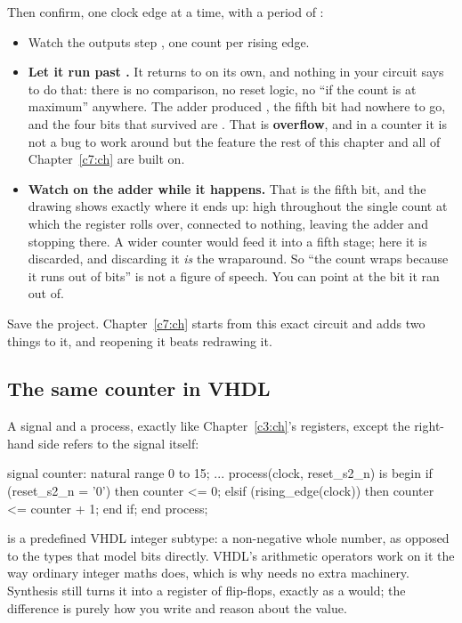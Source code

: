 \noindent Then confirm, one clock edge at a time, with a period of :
\begin{itemize}
  \item Watch the outputs step , one count per rising edge.
  \item \textbf{Let it run past .} It returns to  on its own, and nothing in
    your circuit says to do that: there is no comparison, no reset logic, no ``if the count is at
    maximum'' anywhere. The adder produced , the fifth bit had nowhere to go, and the
    four bits that survived are . That is \textbf{overflow}, and in a counter it is not
    a bug to work around but the feature the rest of this chapter and all of Chapter~\ref{c7:ch}
    are built on.
  \item \textbf{Watch  on the adder while it happens.} That is the fifth bit, and
    the drawing shows exactly where it ends up: high throughout the single count at which the
    register rolls over, connected to nothing, leaving the adder and stopping there. A wider
    counter would feed it into a fifth stage; here it is discarded, and discarding it \emph{is} the
    wraparound. So ``the count wraps because it runs out of bits'' is not a figure of speech. You
    can point at the bit it ran out of.
\end{itemize}
Save the project. Chapter~\ref{c7:ch} starts from this exact circuit and adds two things to it,
and reopening it beats redrawing it.

\subsection{The same counter in VHDL}
\label{c6:vhdlcounter}
A signal and a process, exactly like Chapter~\ref{c3:ch}'s registers, except the right-hand side
refers to the signal itself:

\begin{vhdlcode}
signal counter: natural range 0 to 15;
...
process(clock, reset_s2_n) is
begin
    if (reset_s2_n = '0') then
        counter <= 0;
    elsif (rising_edge(clock)) then
        counter <= counter + 1;
    end if;
end process;
\end{vhdlcode}

\noindent{} is a predefined VHDL integer subtype: a non-negative whole number, as
opposed to the  types that model bits directly. VHDL's arithmetic operators work on
it the way ordinary integer maths does, which is why  needs no extra machinery.
Synthesis still turns it into a register of flip-flops, exactly as a  would;
the difference is purely how you write and reason about the value.

